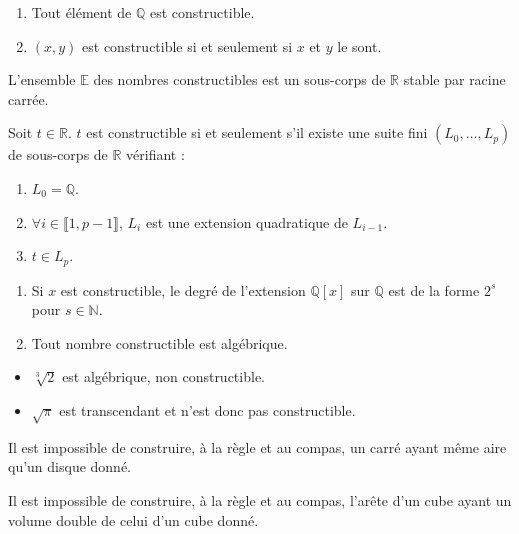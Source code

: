 	\begin{proposition}
		\begin{enumerate}[label=(\roman*)]
			\item Tout élément de $\mathbb{Q}$ est constructible.
			\item $(x,y)$ est constructible si et seulement si $x$ et $y$ le sont.
		\end{enumerate}
	\end{proposition}
	
	\begin{theorem}
		L'ensemble $\mathbb{E}$ des nombres constructibles est un sous-corps de $\mathbb{R}$ stable par racine carrée.
	\end{theorem}
	
	\begin{theorem}[Wantzel]
		Soit $t \in \mathbb{R}$. $t$ est constructible si et seulement s'il existe une suite fini $(L_0, \dots, L_p)$ de sous-corps de $\mathbb{R}$ vérifiant :
		\begin{enumerate}[label=(\roman*)]
			\item $L_0 = \mathbb{Q}$.
			\item $\forall i \in \llbracket 1, p-1 \rrbracket$, $L_i$ est une extension quadratique de $L_{i-1}$.
			\item $t \in L_p$.
		\end{enumerate}
	\end{theorem}
	
	\begin{corollary}
		\begin{enumerate}[label=(\roman*)]
			\item Si $x$ est constructible, le degré de l'extension $\mathbb{Q}[x]$ sur $\mathbb{Q}$ est de la forme $2^s$ pour $s \in \mathbb{N}$.
			\item Tout nombre constructible est algébrique.
		\end{enumerate}
	\end{corollary}
	
	\begin{cexample}
		\begin{itemize}
			\item $\sqrt[3]{2}$ est algébrique, non constructible.
			\item $\sqrt{\pi}$ est transcendant et n'est donc pas constructible.
		\end{itemize}
	\end{cexample}
	
	\begin{application}
		Il est impossible de construire, à la règle et au compas, un carré ayant même aire qu'un disque donné.
	\end{application}
	
	\begin{application}
		Il est impossible de construire, à la règle et au compas, l'arête d'un cube ayant un volume double de celui d'un cube donné.
	\end{application}


